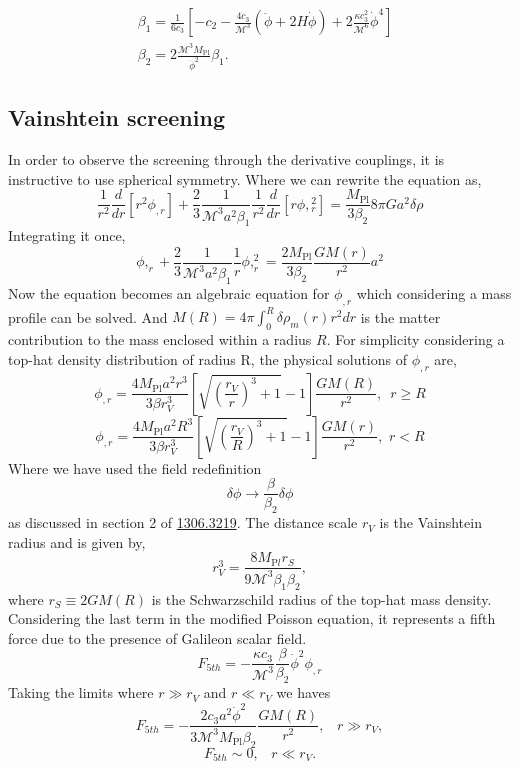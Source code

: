 \documentclass{article}
\def\be{\begin{equation}}
\def\ee{\end{equation}}
\begin{document}
\[
\begin{aligned}
& \beta_{1}=\frac{1}{6 c_{3}}\left[-c_{2}-\frac{4 c_{3}}{\mathcal{M}^{3}}(\ddot{\phi}+2 H \dot{\phi})+2 \frac{\kappa c_{3}^{2}}{\mathcal{M}^{6}} \dot{\phi}^{4}\right] \\
& \beta_{2}=2 \frac{\mathcal{M}^{3} M_{\mathrm{Pl}}}{\dot{\phi}^{2}} \beta_{1} .
\end{aligned}
\]
\subsection{Vainshtein screening}
In order to observe the screening through the derivative couplings, it is instructive to use spherical symmetry. Where we can rewrite the equation as,
\be
\frac{1}{r^{2}} \frac{d}{d r}\left[r^{2} \phi_{,r} \right]+\frac{2}{3} \frac{1}{\mathcal{M}^{3} a^{2}\beta_{1} } \frac{1}{r^{2}} \frac{d}{d r}\left[r \phi,{ }_{r}^{2}\right]  =\frac{M_{\mathrm{Pl}}}{3 \beta_2} 8 \pi G a^{2} \delta \rho
\ee
Integrating it once,
\be
\phi,_{r}+\frac{2}{3} \frac{1}{\mathcal{M}^{3} a^{2}\beta_{1} } \frac{1}{r} \phi,_{r}^{2}=\frac{2 M_{\mathrm{Pl}}}{3 \beta_2} \frac{G M(r)}{r^{2}} a^{2}
\ee
Now the equation becomes an algebraic equation for $\phi_{,r}$ which considering a mass profile can be solved. And \(M(R)=4 \pi \int_{0}^{R} \delta \rho_{m}(r) r^{2} d r\) is the matter contribution to the mass enclosed within a radius \(R\). For simplicity considering a top-hat density distribution of radius R, the physical solutions of $\phi_{,r}$ are,
\be
\phi_{,r}=\frac{4 M_{\mathrm{Pl}} a^{2} r^{3}}{3 \beta r_{V}^{3}}\left[\sqrt{\left(\frac{r_{V}}{r}\right)^{3}+1}-1\right] \frac{G M(R)}{r^{2}}, \,\,\, r \geq R
\ee
\be
\phi_{,r}=\frac{4 M_{\mathrm{Pl}} a^{2} R^{3}}{3 \beta r_{V}^{3}}\left[\sqrt{\left(\frac{r_{V}}{R}\right)^{3}+1}-1\right] \frac{G M(r)}{r^{2}}, \,\, r<R
\ee
Where we have used the field redefinition \[
\delta \phi \rightarrow \frac{\beta}{\beta_{2}} \delta \phi
\] as discussed in section 2 of  \href{https://arxiv.org/abs/1306.3219}{1306.3219}. 
The distance scale $r_V$ is the Vainshtein radius and is given by,
\be
r_{V}^{3}=\frac{8 M_{\mathrm{P}l} r_{S}}{9 \mathcal{M}^{3} \beta_{1} \beta_{2}},
\ee
where \(r_{S} \equiv 2 G M(R)\)  is the Schwarzschild radius of the top-hat mass density.\\

Considering the last term in the modified Poisson equation, it represents a fifth force due to the presence of Galileon scalar field.
\be
F_{5 t h}=-\frac{\kappa c_{3}}{\mathcal{M}^{3}} \frac{\beta}{\beta_{2}} \dot{\phi}^{2} \phi_{,r}
\ee
Taking the limits where \(r \gg r_{V}\) and \(r \ll r_{V}\) we haves
\be
F_{5 t h}  =-\frac{2 c_{3} a^{2} \dot{\phi}^{2}}{3 \mathcal{M}^{3} M_{\mathrm{Pl}} \beta_{2}} \frac{G M(R)}{r^{2}},  \; \; \; r \gg r_{V}, 
\ee
\be
F_{5 t h}  \sim 0,  \; \; \; r \ll r_{V} .
\ee
\end{document}
